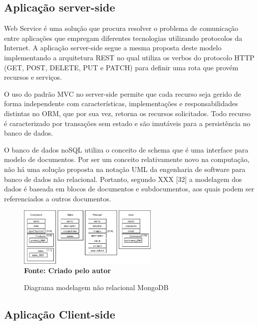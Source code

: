 \subsection{\esp Aplicação server-side}

Web Service é uma solução que procura resolver o problema de comunicação entre aplicações que empregam diferentes tecnologias utilizando protocolos da Internet. A aplicação server-side segue a mesma proposta deste modelo implementando a arquitetura REST no qual utiliza os verbos do protocolo HTTP (GET, POST, DELETE, PUT e PATCH) para definir uma rota que provém recursos e serviços.

O uso do padrão MVC no server-side permite que cada recurso seja gerido de forma independente com características, implementações e responsabilidades distintas no ORM, que por sua vez, retorna os recursos solicitados.  Todo recurso é caracterizado por transações sem estado e são imutáveis para a persistência no banco de dados.

O banco de dados noSQL utiliza o conceito de schema que é uma interface para modelo de documentos. Por ser um conceito relativamente novo na computação, não há uma solução proposta na notação UML da engenharia de software para banco de dados não relacional. Portanto, segundo XXX [32] a modelagem dos dados é baseada em blocos de documentos e subdocumentos, aos quais podem ser referenciados a outros documentos.

\begin{figure}[ht]
	\centering	
	\caption[\hspace{0.1cm}]{Diagrama modelagem não relacional MongoDB}
	\vspace{-0.4cm}
	\includegraphics[width=0.6\textwidth]{figuras/diagrama-banco-de-dados.png}
	 \vspace{-0.2cm}
	\\\textbf{\footnotesize Fonte: Criado pelo autor }
	\label{fig:casodeuso}
\end{figure}
\vspace{-0.5cm}

\subsection{\esp Aplicação Client-side}

